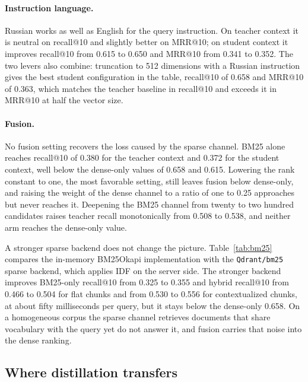 \paragraph{Instruction language.}
Russian works as well as English for the query instruction. On teacher context
it is neutral on recall@10 and slightly better on MRR@10; on student context it
improves recall@10 from 0.615 to 0.650 and MRR@10 from 0.341 to 0.352. The two
levers also combine: truncation to 512 dimensions with a Russian instruction
gives the best student configuration in the table, recall@10 of 0.658 and
MRR@10 of 0.363, which matches the teacher baseline in recall@10 and exceeds it
in MRR@10 at half the vector size.

\paragraph{Fusion.}
No fusion setting recovers the loss caused by the sparse channel. BM25 alone
reaches recall@10 of 0.380 for the teacher context and 0.372 for the student
context, well below the dense-only values of 0.658 and 0.615. Lowering the rank
constant to one, the most favorable setting, still leaves fusion below
dense-only, and raising the weight of the dense channel to a ratio of one to
0.25 approaches but never reaches it. Deepening the BM25 channel from twenty to
two hundred candidates raises teacher recall monotonically from 0.508 to 0.538,
and neither arm reaches the dense-only value.



A stronger sparse backend does not change the picture. Table~\ref{tab:bm25}
compares the in-memory BM25Okapi implementation with the \texttt{Qdrant/bm25}
sparse backend, which applies IDF on the server side. The stronger backend
improves BM25-only recall@10 from 0.325 to 0.355 and hybrid recall@10 from 0.466
to 0.504 for flat chunks and from 0.530 to 0.556 for contextualized chunks, at
about fifty milliseconds per query, but it stays below the dense-only 0.658. On
a homogeneous corpus the sparse channel retrieves documents that share
vocabulary with the query yet do not answer it, and fusion carries that noise
into the dense ranking.



\subsection{Where distillation transfers}
\label{sec:strata}

